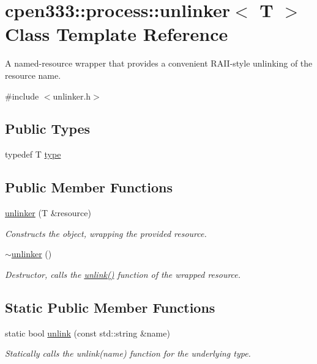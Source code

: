 \hypertarget{classcpen333_1_1process_1_1unlinker}{}\section{cpen333\+:\+:process\+:\+:unlinker$<$ T $>$ Class Template Reference}
\label{classcpen333_1_1process_1_1unlinker}


A named-\/resource wrapper that provides a convenient R\+A\+I\+I-\/style unlinking of the resource name.  




{\ttfamily \#include $<$unlinker.\+h$>$}

\subsection*{Public Types}
\begin{DoxyCompactItemize}
\item 
typedef T \hyperlink{classcpen333_1_1process_1_1unlinker_aca3c99d7ac2fba23d2855c88486c3f51}{type}
\end{DoxyCompactItemize}
\subsection*{Public Member Functions}
\begin{DoxyCompactItemize}
\item 
\hyperlink{classcpen333_1_1process_1_1unlinker_a44039679bd9939254fc53a5e876d8b8c}{unlinker} (T \&resource)
\begin{DoxyCompactList}\small\item\em Constructs the object, wrapping the provided resource. \end{DoxyCompactList}\item 
\mbox{\label{classcpen333_1_1process_1_1unlinker_a1b402f30b9cde1ed09252db7521a1bc2}} 
\hyperlink{classcpen333_1_1process_1_1unlinker_a1b402f30b9cde1ed09252db7521a1bc2}{$\sim$unlinker} ()
\begin{DoxyCompactList}\small\item\em Destructor, calls the {\ttfamily \hyperlink{classcpen333_1_1process_1_1unlinker_a00dd4ad138a95aa0173f81fd83c3210e}{unlink()}} function of the wrapped resource. \end{DoxyCompactList}\end{DoxyCompactItemize}
\subsection*{Static Public Member Functions}
\begin{DoxyCompactItemize}
\item 
static bool \hyperlink{classcpen333_1_1process_1_1unlinker_a00dd4ad138a95aa0173f81fd83c3210e}{unlink} (const std\+::string \&name)
\begin{DoxyCompactList}\small\item\em Statically calls the {\ttfamily unlink(name)} function for the underlying type. \end{DoxyCompactList}\end{DoxyCompactItemize}


